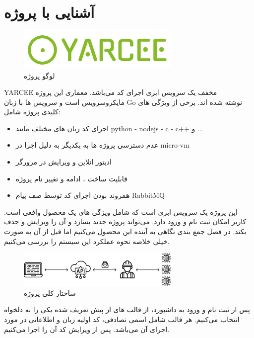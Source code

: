 \chapter{آشنایی با پروژه}

\begin{figure}[h]
    \centering
    \includegraphics[width=0.7\textwidth]{./1-Introduction/yarcee.png}
    \caption{لوگو پروژه}
    \label{fig:yarcee}
\end{figure}

YARCEE مخفف
یک سرویس ابری اجرای کد می‌باشد.
معماری این پروژه مایکروسرویس است و سرویس ها با زبان Go نوشته شده اند.
برخی از ویژگی های کلیدی پروژه شامل:

\begin{itemize}
    \item اجرای کد زبان های مختلف مانند python - nodejs - c - c++ و ...
    \item عدم دسترسی پروژه ها به یکدیگر به دلیل اجرا در micro-vm
    \item ادیتور انلاین و ویرایش در مرورگر
    \item قابلیت ساخت ، ادامه و تغییر نام پروژه
    \item همروند بودن اجرای کد توسط صف پیام RabbitMQ
\end{itemize}


\newpage

این پروژه یک سرویس ابری است که شامل ویژگی های یک محصول واقعی است. کاربر امکان ثبت نام و ورود دارد.
می‌تواند پروژه جدید بسازد و آن را ویرایش و حذف بکند.
در فصل جمع بندی نگاهی به آینده این محصول می‌کنیم اما قبل از آن به صورت خیلی خلاصه نحوه عملکرد این سیستم را بررسی می‌کنیم.


\begin{figure}[htbp]
    \centering
    \includegraphics[width=0.7\textwidth]{./1-Introduction/overview.jpg}
    \caption{ساختار کلی پروژه}
    \label{fig:yarcee-overview}
\end{figure}

پس از ثبت نام و ورود به داشبورد، از قالب های از پیش تعریف شده یکی را به دلخواه انتخاب می‌کنیم. هر قالب شامل اسمی تصادفی، کد اولیه زبان و اطلاعاتی در مورد اجرای آن می‌باشد.
پس از ویرایش کد آن را اجرا می‌کنیم.

